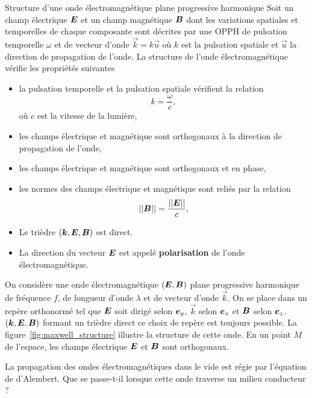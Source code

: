 \begin{defn}{Structure d'une onde électromagnétique plane progressive harmonique}
Soit un champ électrique $\vece$ et un champ magnétique $\vecb$
dont les variations spatiales et temporelles de chaque composante sont décrites 
par une OPPH de pulsation temporelle $\omega$ et de vecteur d'onde $\vec{k} = k \vec{u}$
où $k$ est la pulsation spatiale et $\vec{u}$ la direction de propagation de 
l'onde. La structure de l'onde électromagnétique vérifie les propriétés suivantes
\begin{itemize}
	\item la pulsation temporelle et la pulsation spatiale vérifient la 
	  relation
	  \begin{equation*}
		 k = \dfrac{\omega}{c},
	  \end{equation*}
	  où $c$ est la vitesse de la lumière,
	\item les champs électrique et magnétique sont orthogonaux à la direction
	  de propagation de l'onde,
	\item les champs électrique et magnétique sont orthogonaux et en phase,
	\item les normes des champs électrique et magnétique sont reliés par la
	  relation
	  \begin{equation*}
		  ||\vecb|| = \dfrac{||\vece||}{c},
	 \end{equation*}
	\item Le trièdre $(\vec{k}, \vece, \vecb)$ est direct.
	\item La direction du vecteur 
	  $\vece$ est appelé \textbf{polarisation} de l'onde électromagnétique.
 \end{itemize}
\end{defn}

\begin{exemple}
	On considère une onde électromagnétique $(\vece, \vecb)$ plane progressive
	harmonique de fréquence $f$, de longueur d'onde $\lambda$ et de vecteur 
	d'onde $\vec{k}$. On se place dans un repère orthonormé tel que $\vece$
	soit dirigé selon $\ey$, $\vec{k}$ selon $\ex$ et $\vecb$ selon $\ez$.
	$(\vec{k}, \vece, \vecb)$ formant un trièdre direct ce choix de repère 
	est toujours possible. La figure~\ref{fig:maxwell_structure} illustre
	la structure de cette onde. En un point $M$ de l'espace, les champs
	électrique $\vece$ et $\vecb$ sont orthogonaux.
\end{exemple}


La propagation des ondes électromagnétiques dans le vide est régie par l'équation
de d'Alembert. Que se passe-t-il lorsque cette onde traverse un milieu conducteur ?

